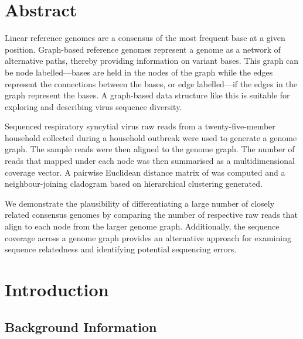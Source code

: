 \documentclass[10pt, a4paper]{article}
\begin{document}
\section{Abstract}
\label{sec:org83a11f6}
\begin{ABSTRACT}
Linear reference genomes are a consensus of the most frequent base at a given
position.
Graph-based reference genomes represent a genome as a network of alternative
paths, thereby providing information on variant bases.
This graph can be node labelled—bases are held in the nodes of the graph while
the edges represent the connections between the bases, or edge labelled—if the
edges in the graph represent the bases. A graph-based data structure like this
is suitable for exploring and describing virus sequence diversity.

Sequenced respiratory syncytial virus raw reads from a twenty-five-member
household collected during a household outbreak were used to generate a genome
graph.
The sample reads were then aligned to the genome graph.
The number of reads that mapped under each node was then summarised as a
multidimensional coverage vector.
A pairwise Euclidean distance matrix of was computed and a neighbour-joining
cladogram based on hierarchical clustering generated.

We demonstrate the plausibility of differentiating a large number of closely
related consensus genomes by comparing the number of respective raw reads that
align to each node from the larger genome graph.
Additionally, the sequence coverage across a genome graph provides an
alternative approach for examining sequence relatedness and identifying
potential sequencing errors.
\end{ABSTRACT}
\setcounter{secnumdepth}{4}

\newpage

\setcounter{tocdepth}{5}
\tableofcontents


\newpage
\listoftables

\newpage
\listoffigures


\newpage
{}

\section{Introduction}
\label{sec:org304e418}
\subsection{Background Information}
\label{sec:orgf6ce162}
\end{document}
